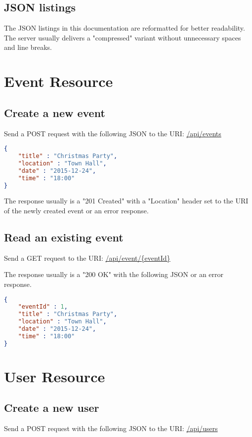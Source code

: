 \documentclass[a4paper,openright,twoside]{report}
\begin{document}
\subsection{JSON listings}
The JSON listings in this documentation are reformatted for better readability. The server usually delivers a "compressed" variant without unnecessary spaces and line breaks.

\section{Event Resource}

\subsection{Create a new event}
Send a POST request with the following JSON to the URI: \url{/api/events}

\begin{lstlisting}[language=json]
{
	"title" : "Christmas Party",
	"location" : "Town Hall",
	"date" : "2015-12-24",
	"time" : "18:00"
}
\end{lstlisting}

The response usually is a "201 Created" with a "Location" header set to the URI of the newly created event or an error response.

\subsection{Read an existing event}
Send a GET request to the URI: \url{/api/event/{eventId}}

The response usually is a "200 OK" with the following JSON or an error response.

\begin{lstlisting}[language=json]
{
	"eventId" : 1,
	"title" : "Christmas Party",
	"location" : "Town Hall",
	"date" : "2015-12-24",
	"time" : "18:00"
}
\end{lstlisting}

\section{User Resource}

\subsection{Create a new user}
Send a POST request with the following JSON to the URI: \url{/api/users}
\end{document}
